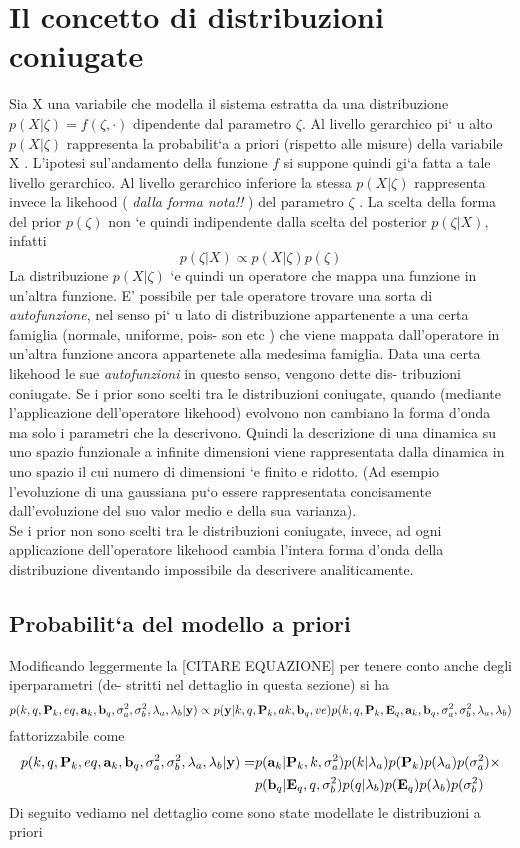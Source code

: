 \section{Il concetto di distribuzioni coniugate}
Sia X una variabile che modella il sistema estratta da una distribuzione $p(X|\zeta) =
f (\zeta, \cdot)$ dipendente dal parametro $\zeta$.
Al livello gerarchico pi`
u alto $p(X|\zeta)$ rappresenta la probabilit`a a priori (rispetto alle
misure) della variabile X .
L’ipotesi sul’andamento della funzione $f$ si suppone quindi gi`a fatta a tale livello
gerarchico.
Al livello gerarchico inferiore la stessa $p(X|\zeta)$ rappresenta invece la likehood ( \textit{dalla
forma nota!! }) del parametro $\zeta$ . La scelta della forma del prior $p(\zeta)$ non `e quindi
indipendente dalla scelta del posterior $p(\zeta|X)$, infatti
\begin{equation}
p(\zeta|X)\propto p(X|\zeta)p(\zeta)
\end{equation}
La distribuzione $p(X|\zeta)$ `e quindi un operatore che mappa una funzione in un’altra
funzione. E’ possibile per tale operatore trovare una sorta di \emph{autofunzione}, nel senso
pi`
u lato di distribuzione appartenente a una certa famiglia (normale, uniforme, pois-
son etc ) che viene mappata dall’operatore in un’altra funzione ancora appartenete
alla medesima famiglia.
Data una certa likehood le sue \emph{autofunzioni} in questo senso, vengono dette dis-
tribuzioni coniugate.
Se i prior sono scelti tra le distribuzioni coniugate, quando (mediante l’applicazione
dell’operatore likehood) evolvono non cambiano la forma d’onda ma solo i parametri
che la descrivono. Quindi la descrizione di una dinamica su uno spazio funzionale a
infinite dimensioni viene rappresentata dalla dinamica in uno spazio il cui numero di
dimensioni `e finito e ridotto. (Ad esempio l’evoluzione di una gaussiana pu`o essere
rappresentata concisamente dall’evoluzione del suo valor medio e della sua varianza).\\
Se  i prior non sono scelti tra le distribuzioni coniugate, invece, ad ogni applicazione
dell’operatore likehood cambia l’intera forma d’onda della distribuzione diventando
impossibile da descrivere analiticamente.
\subsection{Probabilit`a del modello a priori}
Modificando leggermente la [CITARE EQUAZIONE] per tenere conto anche degli iperparametri (de-
stritti nel dettaglio in questa sezione) si ha
\begin{equation}
p(k,q,\textbf{P}_k,eq,\textbf{a}_k,\textbf{b}_q,\sigma_a^2,\sigma_b^2,\lambda_a,\lambda_b|\textbf{y})\propto
p(\textbf{y}|k,q,\textbf{P}_k,ak,\textbf{b}_q,ve)
p(k,q,\textbf{P}_k,\textbf{E}_q,\textbf{a}_k,\textbf{b}_q,\sigma_a^2,\sigma_b^2,\lambda_a,\lambda_b)
\end{equation}
fattorizzabile come
\begin{align}
p(k,q,\textbf{P}_k,eq,\textbf{a}_k,\textbf{b}_q,\sigma_a^2,\sigma_b^2,\lambda_a,\lambda_b|\textbf{y})= & p(\textbf{a}_k|\textbf{P}_k,k,\sigma_a^2)p(k|\lambda_a)p(\textbf{P}_k)p(\lambda_a)p(\sigma_a^2)\times \nonumber\\
& p(\textbf{b}_q|\textbf{E}_q,q,\sigma_b^2)p(q|\lambda_b)p(\textbf{E}_q)p(\lambda_b)p(\sigma_b^2)
\end{align}
Di seguito vediamo nel dettaglio come sono state modellate le distribuzioni a priori
